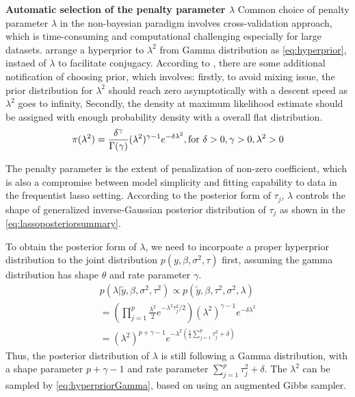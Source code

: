 \textbf{Automatic selection of the penalty parameter $\lambda$}
Common choice of penalty parameter $\lambda$ in the non-bayesian paradigm involves cross-validation approach, which is time-consuming and computational challenging especially for large datasets.
\cite{park_casella_2008} arrange a hyperprior to $\lambda^2$ from Gamma distribution as \ref{eq:hyperprior}, instaed of $\lambda$ to facilitate conjugacy.
According to \cite{park_casella_2008}, there are some additional notification of choosing prior, which involves: firstly, to avoid mixing issue, the prior distribution for $\lambda^2$ should reach zero asymptotically with a descent speed as $\lambda^2 $ goes to infinity, Secondly, the density at maximum likelihood estimate should be assigned with enough probability density with a overall flat distribution.
\begin{equation}
	\label{eq:hyperprior}
	\pi(\lambda^2) = \frac{\delta^\gamma}{\Gamma(\gamma)}(\lambda^2)^{\gamma-1}e^{-\delta\lambda^2}, \textnormal{for } \delta>0, \gamma>0, \lambda^2>0
\end{equation}

 The penalty parameter is the extent of penalization of non-zero coefficient, which is also a compromise between model simplicity and fitting capability to data in the frequentist lasso setting. According to the posterior form of $\tau_j$, $\lambda$ controls the shape of generalized inverse-Gaussian posterior distribution of $\tau_j$ as shown in the \ref{eq:lassoposteriorsummary}.

To obtain the posterior form of $\lambda$, we need to incorpoate a proper hyperprior distribution to the joint distribution $p(y,\beta,\sigma^2,\tau)$ first, assuming the gamma distribution has shape $\theta$ and rate parameter $\gamma$.
\begin{equation}
	\label{eq:hyperpriorGamma}
	\begin{multlined}
	p(\lambda|\tilde{y},\beta,\sigma^2,\tau^2) \propto  	p(\tilde{y},\beta,\tau^2,\sigma^2,\lambda)  \\
	= (\prod_{j=1}^p \frac{\lambda^2}{2} e^{-\lambda^2\tau_j^2/2})(\lambda^2)^{\gamma-1}e^{-\delta\lambda^2}\\
	= (\lambda^2)^{p+\gamma-1}e^{-\lambda^2(\frac{1}{2}\sum_{j=1}^p \tau_j^2+\delta)}
\end{multlined}
\end{equation} 
Thus, the posterior distribution of $\lambda$ is still following a Gamma distribution, with a shape parameter $p+\gamma-1$ and rate parameter $\sum_{j=1}^p \tau_j^2+\delta$. The $\lambda^2$ can be sampled by \ref{eq:hyperpriorGamma}, based on using an augmented Gibbs sampler.

